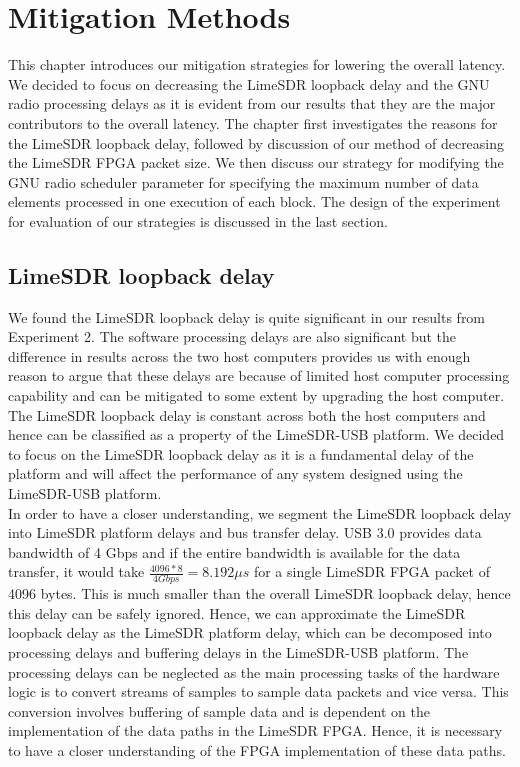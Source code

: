 \chapter{Mitigation Methods}
This chapter introduces our mitigation strategies for lowering the overall latency.
We decided to focus on decreasing the LimeSDR loopback delay and the GNU radio processing delays as it is evident from our results that they are the major contributors to the overall latency.
The chapter first investigates the reasons for the LimeSDR loopback delay, followed by discussion of our method of decreasing the LimeSDR FPGA packet size.
We then discuss our strategy for modifying the GNU radio scheduler parameter for specifying the maximum number of data elements processed in one execution of each block.
The design of the experiment for evaluation of our strategies is discussed in the last section.

\section{LimeSDR loopback delay}
We found the LimeSDR loopback delay is quite significant in our results from Experiment 2.
The software processing delays are also significant but the difference in results across the two host computers provides us with enough reason to argue that these delays are because of limited host computer processing capability and can be mitigated to some extent by upgrading the host computer.
The LimeSDR loopback delay is constant across both the host computers and hence can be classified as a property of the LimeSDR-USB platform.
We decided to focus on the LimeSDR loopback delay as it is a fundamental delay of the platform and will affect the performance of any system designed using the LimeSDR-USB platform.\\

In order to have a closer understanding, we segment the LimeSDR loopback delay into LimeSDR platform delays and bus transfer delay.
\ac{USB} 3.0 provides data bandwidth of 4 Gbps and if the entire bandwidth is available for the data transfer, it would take $\frac{4096*8}{4 Gbps} = 8.192 \mu s$ for a single LimeSDR FPGA packet of 4096 bytes.
This is much smaller than the overall LimeSDR loopback delay, hence this delay can be safely ignored.
Hence, we can approximate the LimeSDR loopback delay as the LimeSDR platform delay, which can be decomposed into processing delays and buffering delays in the LimeSDR-USB platform.
The processing delays can be neglected as the main processing tasks of the hardware logic is to convert streams of samples to sample data packets and vice versa.
This conversion involves buffering of sample data and is dependent on the implementation of the data paths in the LimeSDR FPGA.
Hence, it is necessary to have a closer understanding of the FPGA implementation of these data paths.\\

